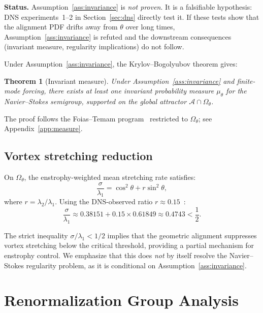 \documentclass[12pt,a4paper]{article}
\newtheorem{theorem}{Theorem}
\begin{document}
\noindent\textbf{Status.}
Assumption~\ref{ass:invariance} is \emph{not proven}.
It is a falsifiable hypothesis: DNS experiments~1--2 in Section~\ref{sec:dns} directly test it.
If these tests show that the alignment PDF drifts away from $\theta$ over long times, Assumption~\ref{ass:invariance} is refuted and the downstream consequences (invariant measure, regularity implications) do not follow.

Under Assumption~\ref{ass:invariance}, the Krylov--Bogolyubov theorem gives:

\begin{theorem}[Invariant measure]
\label{thm:measure}
Under Assumption~\ref{ass:invariance} and finite-mode forcing, there exists at least one invariant probability measure $\mu_\theta$ for the Navier--Stokes semigroup, supported on the global attractor $\mathcal{A} \cap \Omega_\theta$.
\end{theorem}

\noindent The proof follows the Foias--Temam program~\cite{FoiasTemam1987} restricted to $\Omega_\theta$; see Appendix~\ref{app:measure}.

\subsection{Vortex stretching reduction}

On $\Omega_\theta$, the enstrophy-weighted mean stretching rate satisfies:
\begin{equation}
\label{eq:stretching}
\frac{\sigma}{\lambda_1} = \cos^2\theta + r\sin^2\theta,
\end{equation}
where $r = \lambda_2/\lambda_1$.
Using the DNS-observed ratio $r \approx 0.15$~\cite{Tsinober1992}:
\begin{equation}
\frac{\sigma}{\lambda_1} \approx 0.38151 + 0.15 \times 0.61849 \approx 0.4743 < \frac{1}{2}.
\end{equation}

The strict inequality $\sigma/\lambda_1 < 1/2$ implies that the geometric alignment suppresses vortex stretching below the critical threshold, providing a partial mechanism for enstrophy control.
We emphasize that this does \emph{not} by itself resolve the Navier--Stokes regularity problem, as it is conditional on Assumption~\ref{ass:invariance}.

\section{Renormalization Group Analysis}
\label{sec:rg}
\end{document}
